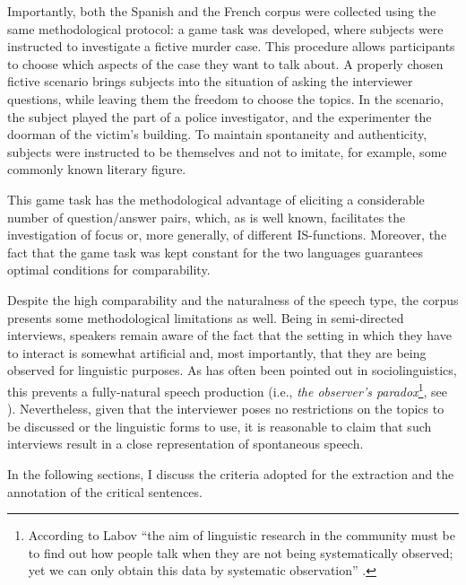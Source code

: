 Importantly, both the Spanish and the French corpus were collected using the same methodological protocol: a game task was developed, where  subjects were instructed to investigate a fictive murder case. This procedure allows participants to choose which aspects of the case they want to talk about. A properly chosen fictive scenario brings subjects into the situation of asking the interviewer questions, while leaving them the freedom to choose the topics. In the scenario, the subject played the part of a police investigator, and the experimenter the doorman of the victim’s building. To maintain spontaneity and authenticity, subjects were instructed to be themselves and not to imitate, for example, some commonly known literary figure.

This game task has the methodological advantage of eliciting a considerable number of question/answer pairs, which, as is well known, facilitates the investigation of focus or, more generally, of different IS-functions. Moreover, the fact that the game task was kept constant for the two languages guarantees optimal conditions for comparability. 

Despite the high comparability and the naturalness of the speech type, the corpus presents some methodological limitations as well. Being in semi-directed interviews, speakers remain aware of the fact that the setting in which they have to interact is somewhat artificial and, most importantly, that they are being observed for linguistic purposes. As has often been pointed out in sociolinguistics, this prevents a fully-natural speech production (i.e., \textit{the observer's paradox}\footnote{According to Labov ``the aim of linguistic research in the community must be to find out how people talk when they are not being systematically observed; yet we can only obtain this data by systematic observation” \parencite[209]{labov1972sociolinguistic}.}, see \cite{labov1972sociolinguistic}). Nevertheless, given that the interviewer poses no restrictions on the topics to be discussed or the linguistic forms to use, it is reasonable to claim that such interviews result in a close representation of spontaneous speech. 

In the following sections, I discuss the criteria adopted for the extraction and the annotation of the critical sentences.



